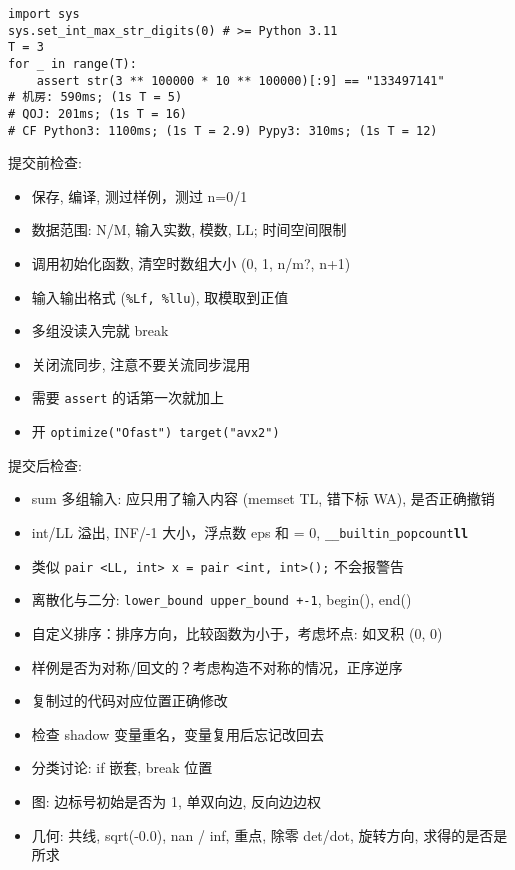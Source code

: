 \begin{small}
\begin{itemize}[leftmargin=1mm]
\begin{verbatim}
import sys
sys.set_int_max_str_digits(0) # >= Python 3.11 
T = 3
for _ in range(T):
    assert str(3 ** 100000 * 10 ** 100000)[:9] == "133497141"
# 机房: 590ms; (1s T = 5)
# QOJ: 201ms; (1s T = 16)
# CF Python3: 1100ms; (1s T = 2.9) Pypy3: 310ms; (1s T = 12)
\end{verbatim}
\end{itemize}
提交前检查: 
\begin{itemize}[leftmargin=1mm]
    \setlength{\itemsep}{0pt}
    \setlength{\parskip}{0.5pt}
\item 保存, 编译, 测过样例，测过 n=0/1
\item 数据范围: N/M, 输入实数, 模数, LL; 时间空间限制
\item 调用初始化函数, 清空时数组大小 (0, 1, n/m?, n+1)
\item 输入输出格式 (\texttt{\%Lf, \%llu}), 取模取到正值
\item 多组没读入完就 break
\item 关闭流同步, 注意不要关流同步混用
\item 需要 \texttt{assert} 的话第一次就加上
\item 开 \texttt{optimize("Ofast") target("avx2")}
\end{itemize}
提交后检查:
\begin{itemize}[leftmargin=1mm]
\setlength{\itemsep}{0pt}
\setlength{\parskip}{0.5pt}
\item sum 多组输入: 应只用了输入内容 (memset TL, 错下标 WA), 是否正确撤销
\item int/LL 溢出, INF/-1 大小，浮点数 eps 和 = 0, \texttt{\_\_builtin\_popcount\textbf{ll}}
\item 类似 \texttt{pair <LL, int> x = pair <int, int>();} 不会报警告 
\item 离散化与二分: \texttt{lower\_bound upper\_bound +-1}, begin(), end()
\item 自定义排序：排序方向，比较函数为小于，考虑坏点: 如叉积 (0, 0)
\item 样例是否为对称/回文的？考虑构造不对称的情况，正序逆序
\item 复制过的代码对应位置正确修改
\item 检查 shadow 变量重名，变量复用后忘记改回去
\item 分类讨论: if 嵌套, break 位置
\item 图: 边标号初始是否为 1, 单双向边, 反向边边权
\item 几何: 共线, sqrt(-0.0), nan / inf, 重点, 除零 det/dot, 旋转方向, 求得的是否是所求
\end{itemize}
\end{small}